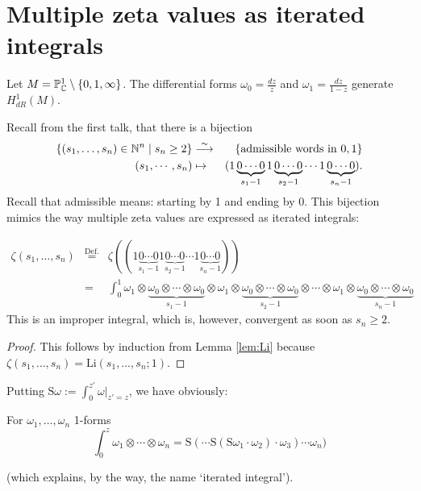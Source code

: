 \section{Multiple zeta values as iterated integrals}

Let $M = \mathbb{P}_{\mathbb{C}}^1 \setminus \{0, 1, \infty\}$. The differential forms $\omega_0 = \frac{dz}{z}$ and $\omega_1 = \frac{dz}{1-z}$ generate $H^1_{dR}(M)$.

Recall from the first talk, that 
there is a bijection
\begin{eqnarray*}
\left\{ (s_1, \dots, s_n) \in \mathbb{N}^n \mid s_n \geq 2 \right \} &\overset{\sim}{\longrightarrow} & \{ \textrm{admissible words in $0, 1$} \}\\
(s_1, \cdots, s_n) &\mapsto & (1 \underbrace{0 \cdots 0}_{s_1 -1} 1 \underbrace{0 \cdots 0}_{s_2 -1} \cdots 1 \underbrace{0 \cdots 0}_{s_n -1}).
\end{eqnarray*}
Recall that admissible means: starting by 1 and ending by 0.
This bijection mimics the way multiple zeta values are expressed as iterated integrals:


\begin{prop}\label{prop:mzviterint}
\begin{eqnarray*}
\zeta(s_1, \ldots, s_n) &\overset{\text{Def.}}=& \zeta((1 \underbrace{0 \cdots 0}_{s_1 -1} 1 \underbrace{0 \cdots 0}_{s_2 -1} \cdots 1 \underbrace{0 \cdots 0}_{s_n -1}))\\
&=& \int_0^1 \omega_1  \otimes  \underbrace{\omega_0 \otimes \cdots  \otimes  \omega_0}_{s_1 -1} \otimes  \omega_1  \otimes \underbrace{\omega_0  \otimes \cdots \otimes  \omega_0}_{s_2 - 1}  \otimes \cdots \otimes  \omega_1  \otimes \underbrace{\omega_0  \otimes \cdots  \otimes \omega_0}_{s_n - 1}
\end{eqnarray*}
This is an improper integral, which is, however, convergent as soon as $s_n\ge 2$.
\end{prop}
\begin{proof}
This follows by induction from Lemma \ref{lem:Li} because $\zeta(s_1, \ldots, s_n) = \mathrm{Li}(s_1, \ldots, s_n; 1)$.
\end{proof}



Putting $\mathrm{S} \omega := \int_0^{z'} \omega |_{z'=z}$, we have obviously:
\begin{lemma}
For $\omega_1, \dots, \omega_n$ 1-forms
\[
\int_0^z \omega_1\otimes  \cdots \otimes  \omega_n = \mathrm{S}( \cdots \mathrm{S}(\mathrm{S} \omega_1 \cdot \omega_2) \cdot \omega_3) \cdots \omega_n)
\]
\end{lemma}
(which explains, by the way, the name `iterated integral').

